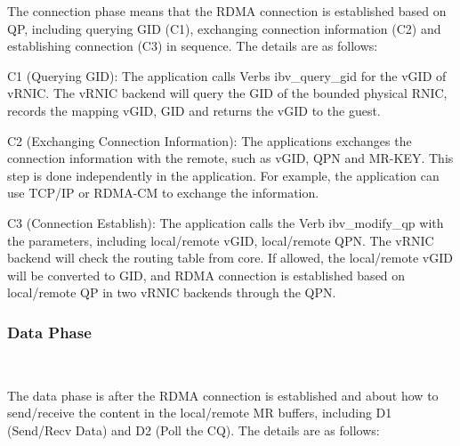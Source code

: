 The connection phase means that the RDMA connection is established based on QP, including querying GID (C1), exchanging connection information (C2) and establishing connection (C3) in sequence. The details are as follows:

C1 (Querying GID): The application calls Verbs ibv\_query\_gid for the vGID of vRNIC. The vRNIC backend will query the GID of the bounded physical RNIC, records the mapping {vGID, GID} and returns the vGID to the guest.

C2 (Exchanging Connection Information): The applications exchanges the connection information with the remote, such as vGID, QPN and MR-KEY. This step is done independently in the application. For example, the application can use TCP/IP or RDMA-CM to exchange the information.

C3 (Connection Establish): The application calls the Verb ibv\_modify\_qp with the parameters, including local/remote vGID, local/remote QPN. The vRNIC backend will check the routing table from \sys core. If allowed, the local/remote vGID will be converted to GID, and RDMA connection is established based on local/remote QP in two vRNIC backends through the QPN. 

\subsubsection{\textbf{Data Phase}}
\
\noindent

The data phase is after the RDMA connection is established and about how to send/receive the content in the local/remote MR buffers, including D1 (Send/Recv Data) and D2 (Poll the CQ). The details are as follows:


